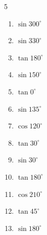 \begin{multicols}{5}
\begin{enumerate}
  \item $\displaystyle \sin{300^\circ}$


  \item $\displaystyle \sin{330^\circ}$


  \item $\displaystyle \tan{180^\circ}$

        \phantom{$\displaystyle =0$}

  \item $\displaystyle \sin{150^\circ}$


  \item $\displaystyle \tan{0^\circ}$

        \phantom{$\displaystyle =0$}

  \item $\displaystyle \sin{135^\circ}$


  \item $\displaystyle \cos{120^\circ}$


  \item $\displaystyle \tan{30^\circ}$


  \item $\displaystyle \sin{30^\circ}$


  \item $\displaystyle \tan{180^\circ}$

        \phantom{$\displaystyle =0$}

  \item $\displaystyle \cos{210^\circ}$


  \item $\displaystyle \tan{45^\circ}$

        \phantom{$\displaystyle =1$}

  \item $\displaystyle \sin{180^\circ}$


\end{enumerate}
\end{multicols}

